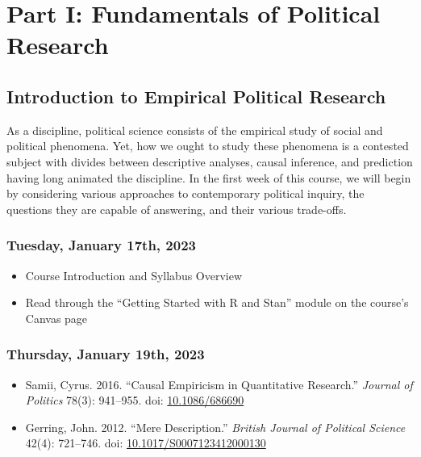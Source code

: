 \documentclass[12pt,]{article}
\begin{document}
\hypertarget{part-i-fundamentals-of-political-research}{%
\section{Part I: Fundamentals of Political
Research}\label{part-i-fundamentals-of-political-research}}

\hypertarget{introduction-to-empirical-political-research}{%
\subsection{Introduction to Empirical Political
Research}\label{introduction-to-empirical-political-research}}

\noindent As a discipline, political science consists of the empirical
study of social and political phenomena. Yet, how we ought to study
these phenomena is a contested subject with divides between descriptive
analyses, causal inference, and prediction having long animated the
discipline. In the first week of this course, we will begin by
considering various approaches to contemporary political inquiry, the
questions they are capable of answering, and their various trade-offs.

\hypertarget{tuesday-january-17th-2023}{%
\subsubsection{Tuesday, January 17th,
2023}\label{tuesday-january-17th-2023}}

\begin{itemize}
\item
  Course Introduction and Syllabus Overview
\item
  Read through the ``Getting Started with R and Stan'' module on the
  course's Canvas page
\end{itemize}

\hypertarget{thursday-january-19th-2023}{%
\subsubsection{Thursday, January 19th,
2023}\label{thursday-january-19th-2023}}

\begin{itemize}
\item
  Samii, Cyrus. 2016. ``Causal Empiricism in Quantitative Research.''
  \emph{Journal of Politics} 78(3): 941--955. doi:
  \href{https://doi.org/10.1086/686690}{10.1086/686690}
\item
  Gerring, John. 2012. ``Mere Description.'' \emph{British Journal of
  Political Science} 42(4): 721--746. doi:
  \href{https://doi.org/10.1017/S0007123412000130}{10.1017/S0007123412000130}
\end{itemize}
\end{document}
